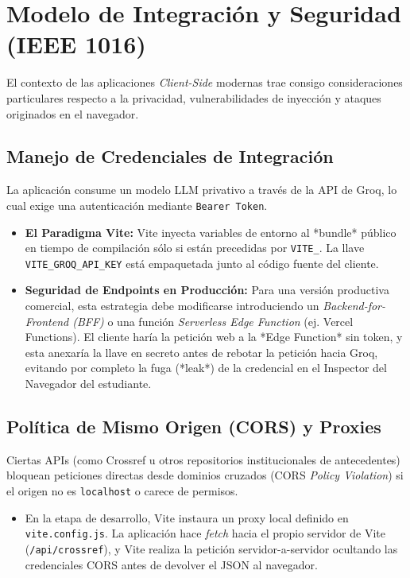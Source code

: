 \section{Modelo de Integración y Seguridad (IEEE 1016)}

El contexto de las aplicaciones \textit{Client-Side} modernas trae consigo consideraciones particulares respecto a la privacidad, vulnerabilidades de inyección y ataques originados en el navegador.

\subsection{Manejo de Credenciales de Integración}
La aplicación consume un modelo LLM privativo a través de la API de Groq, lo cual exige una autenticación mediante \texttt{Bearer Token}.
\begin{itemize}
    \item \textbf{El Paradigma Vite:} Vite inyecta variables de entorno al *bundle* público en tiempo de compilación sólo si están precedidas por \texttt{VITE\_}. La llave \texttt{VITE\_GROQ\_API\_KEY} está empaquetada junto al código fuente del cliente.
    \item \textbf{Seguridad de Endpoints en Producción:} Para una versión productiva comercial, esta estrategia debe modificarse introduciendo un \textit{Backend-for-Frontend (BFF)} o una función \textit{Serverless Edge Function} (ej. Vercel Functions). El cliente haría la petición web a la *Edge Function* sin token, y esta anexaría la llave en secreto antes de rebotar la petición hacia Groq, evitando por completo la fuga (*leak*) de la credencial en el Inspector del Navegador del estudiante.
\end{itemize}

\subsection{Política de Mismo Origen (CORS) y Proxies}
Ciertas APIs (como Crossref u otros repositorios institucionales de antecedentes) bloquean peticiones directas desde dominios cruzados (CORS \textit{Policy Violation}) si el origen no es \texttt{localhost} o carece de permisos.
\begin{itemize}
    \item En la etapa de desarrollo, Vite instaura un proxy local definido en \texttt{vite.config.js}. La aplicación hace \textit{fetch} hacia el propio servidor de Vite (\texttt{/api/crossref}), y Vite realiza la petición servidor-a-servidor ocultando las credenciales CORS antes de devolver el JSON al navegador.
\end{itemize}


